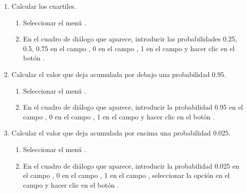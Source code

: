 \begin{enumerate}[leftmargin=*]
\begin{enumerate}
\item Calcular los cuartiles.
\begin{indicacion}{
\begin{enumerate}
\item Seleccionar el menú .
\item En el cuadro de diálogo que aparece, introducir las probabilidades 0.25, 0.5, 0.75 en el campo , 0 en el
campo , 1 en el campo  y hacer clic en el botón .
\end{enumerate}}
\end{indicacion}

\item Calcular el valor que deja acumulada por debajo una probabilidad $0.95$.
\begin{indicacion}{
\begin{enumerate}
\item Seleccionar el menú .
\item En el cuadro de diálogo que aparece, introducir la probabilidad 0.95 en el campo , 0 en el
campo , 1 en el campo  y hacer clic en el botón .
\end{enumerate}}
\end{indicacion}

\item Calcular el valor que deja acumulada por encima una probabilidad $0.025$.
\begin{indicacion}{
\begin{enumerate}
\item Seleccionar el menú .
\item En el cuadro de diálogo que aparece, introducir la probabilidad 0.025 en el campo , 0
en el campo , 1 en el campo , seleccionar la opción  en el campo
 y hacer clic en el botón .
\end{enumerate}}
\end{indicacion}
\end{enumerate}



\end{enumerate}
